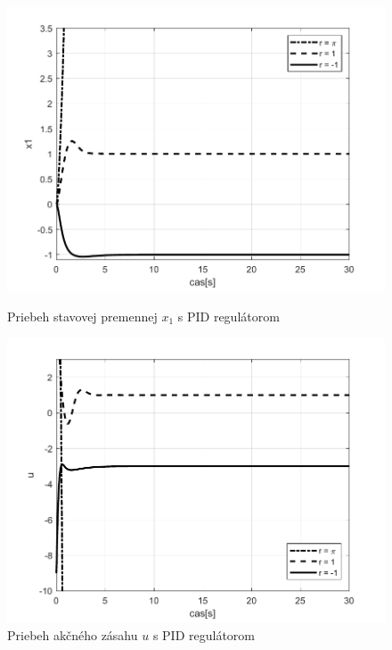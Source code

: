 \documentclass[../main.tex]{subfiles}
\begin{document}
\begin{figure}[!htb]
   \begin{minipage}{0.46\textwidth}
     \centering
     \includegraphics[width=1\linewidth]{xpid.pdf}
     \caption{Priebeh stavovej premennej $x_1$ s PID regulátorom}
	\label{fig:Vysledok1}
   \end{minipage}\hfill
   \begin{minipage}{0.46\textwidth}
     \centering
     \includegraphics[width=1\linewidth]{upid.pdf}
     \caption{Priebeh akčného zásahu $u$ s PID regulátorom}
	\label{fig:Vysledok2}
   \end{minipage}
\end{figure}
\end{document}

